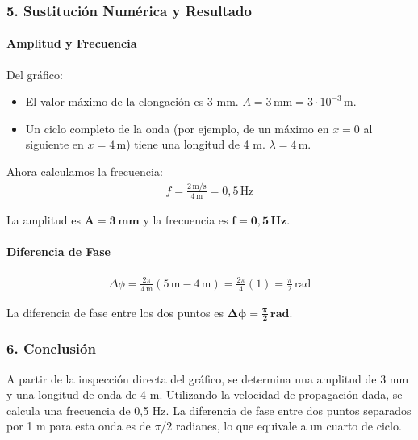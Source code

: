 \subsubsection*{5. Sustitución Numérica y Resultado}
\paragraph*{Amplitud y Frecuencia}
Del gráfico:
\begin{itemize}
    \item El valor máximo de la elongación es 3 mm. \quad $A=3\,\text{mm} = 3\cdot10^{-3}\,\text{m}$.
    \item Un ciclo completo de la onda (por ejemplo, de un máximo en $x=0$ al siguiente en $x=4\,\text{m}$) tiene una longitud de 4 m. \quad $\lambda=4\,\text{m}$.
\end{itemize}
Ahora calculamos la frecuencia:
\begin{gather}
    f = \frac{2\,\text{m/s}}{4\,\text{m}} = 0,5\,\text{Hz}
\end{gather}
\begin{cajaresultado}
    La amplitud es $\boldsymbol{A=3\,\textbf{mm}}$ y la frecuencia es $\boldsymbol{f=0,5\,\textbf{Hz}}$.
\end{cajaresultado}
\paragraph*{Diferencia de Fase}
\begin{gather}
    \Delta\phi = \frac{2\pi}{4\,\text{m}}(5\,\text{m} - 4\,\text{m}) = \frac{2\pi}{4}(1) = \frac{\pi}{2} \, \text{rad}
\end{gather}
\begin{cajaresultado}
    La diferencia de fase entre los dos puntos es $\boldsymbol{\Delta\phi = \frac{\pi}{2}\,\textbf{rad}}$.
\end{cajaresultado}

\subsubsection*{6. Conclusión}
\begin{cajaconclusion}
A partir de la inspección directa del gráfico, se determina una amplitud de 3 mm y una longitud de onda de 4 m. Utilizando la velocidad de propagación dada, se calcula una frecuencia de 0,5 Hz. La diferencia de fase entre dos puntos separados por 1 m para esta onda es de $\pi/2$ radianes, lo que equivale a un cuarto de ciclo.
\end{cajaconclusion}

